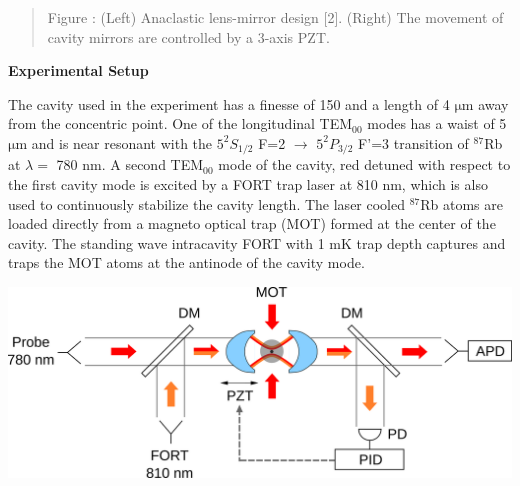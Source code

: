 \documentclass[portrait,a0,final]{a0poster} %
\makeatletter
\newenvironment{figurehere}
  {\def\@captype{figure}}
  {}
\newcommand{\figcaption}[1]{
  \vspace{0.5cm}
  \begin{center}
  \begin{quote}
    {\large {\sc Figure} \arabic{figure}: #1}
  \end{quote}
  \end{center}
  \stepcounter{figure}
}
\newenvironment{poster}{
  \begin{center}
  \begin{minipage}[c]{0.98\textwidth}
}{
  \end{minipage}
  \end{center}
}
\makeatother
\begin{document}
\begin{poster}
\begin{multicols}{2}
\begin{figurehere}
\vspace{-1cm}

  \figcaption{(Left) Anaclastic lens-mirror design [2]. (Right) The movement of cavity mirrors  are controlled by a 3-axis PZT. }
\end{figurehere}



\begin{center}
     \begin{center} {\bf \Large \textsf {Experimental Setup}}\end{center}
\end{center}
The cavity used in the experiment has a finesse of 150 and a length of 4 $ \mathrm{\mu m}$ away from the concentric point. One of the longitudinal TEM$_{00}$ modes has a waist of 5 $ \mathrm{\mu m}$ and is near resonant with the $5^2 S_{1/2}$ F=2 $\rightarrow$ $5^2 P_{3/2}$ F'=3 transition of $^{87}$Rb at $\lambda=$ 780 nm. A second TEM$_{00}$ mode of the cavity, red detuned with respect to the first cavity mode is excited by a FORT trap laser at 810 nm, which is also used to continuously stabilize the cavity length. The laser cooled $^{87}$Rb atoms are loaded directly from a magneto optical trap (MOT) formed at the center of the cavity. The standing wave intracavity FORT with 1 mK trap depth captures and traps the MOT atoms at the antinode of the cavity mode. 
\begin{figurehere}
  \begin{center}
    \includegraphics[width=0.8\columnwidth]{stabilise.pdf}
  \end{center}

\vspace{-1cm}


\end{figurehere}
\end{multicols}
\end{poster}
\end{document}
